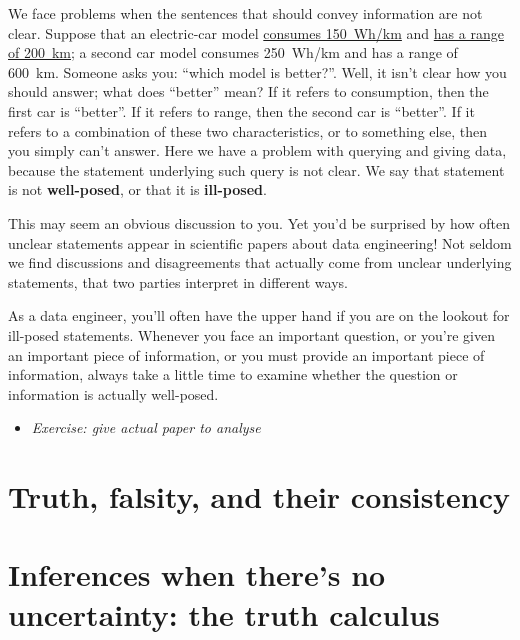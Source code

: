 \documentclass[]{book}
\providecommand{\tightlist}{%
  \setlength{\itemsep}{0pt}\setlength{\parskip}{0pt}}
\begin{document}
We face problems when the sentences that should convey information are not clear. Suppose that an electric-car model \href{https://ev-database.org/cheatsheet/energy-consumption-electric-car}{consumes 150~Wh/km} and \href{https://ev-database.org/cheatsheet/range-electric-car}{has a range of 200~km}; a second car model consumes 250~Wh/km and has a range of 600~km. Someone asks you: ``which model is better?''. Well, it isn't clear how you should answer; what does ``better'' mean? If it refers to consumption, then the first car is ``better''. If it refers to range, then the second car is ``better''. If it refers to a combination of these two characteristics, or to something else, then you simply can't answer. Here we have a problem with querying and giving data, because the statement underlying such query is not clear. We say that statement is not \textbf{well-posed}, or that it is \textbf{ill-posed}.

This may seem an obvious discussion to you. Yet you'd be surprised by how often unclear statements appear in scientific papers about data engineering! Not seldom we find discussions and disagreements that actually come from unclear underlying statements, that two parties interpret in different ways.

As a data engineer, you'll often have the upper hand if you are on the lookout for ill-posed statements. Whenever you face an important question, or you're given an important piece of information, or you must provide an important piece of information, always take a little time to examine whether the question or information is actually well-posed.

\begin{itemize}
\tightlist
\item
  \emph{Exercise: give actual paper to analyse}
\end{itemize}

\hypertarget{truth-falsity-and-their-consistency}{%
\section{Truth, falsity, and their consistency}\label{truth-falsity-and-their-consistency}}

\hypertarget{inferences-when-theres-no-uncertainty-the-truth-calculus}{%
\section{Inferences when there's no uncertainty: the truth calculus}\label{inferences-when-theres-no-uncertainty-the-truth-calculus}}
\end{document}
